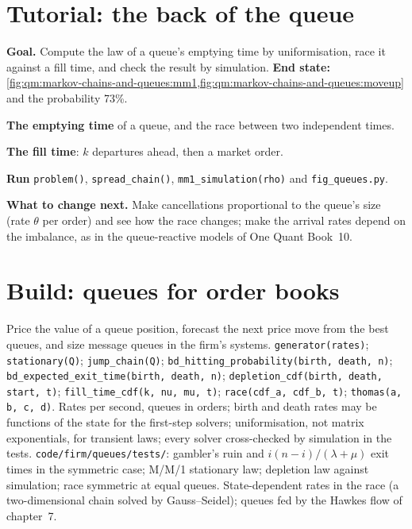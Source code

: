 \section{Tutorial: the back of the queue}\label{tut:qm:markov-chains-and-queues:queue}

\begin{tutorial}
\textbf{Goal.} Compute the law of a queue's emptying time by uniformisation, race it against a fill time, and
check the result by simulation. \textbf{End state:}
\cref{fig:qm:markov-chains-and-queues:mm1,fig:qm:markov-chains-and-queues:moveup} and the probability 73\%.
\begin{tutsteps}
\item \textbf{The emptying time} of a queue, and the race between two independent times.
\label{lst:qm:markov-chains-and-queues:depletion}
\item \textbf{The fill time}: $k$ departures ahead, then a market order.
\label{lst:qm:markov-chains-and-queues:fill}
\item \textbf{Run} \texttt{problem()}, \texttt{spread\_chain()}, \texttt{mm1\_simulation(rho)} and
\texttt{fig\_queues.py}.
\end{tutsteps}
\textbf{What to change next.} Make cancellations proportional to the queue's size (rate $\theta$ per order) and see
how the race changes; make the arrival rates depend on the imbalance, as in the queue-reactive models of One
Quant Book~10.
\end{tutorial}

\section{Build: queues for order books}\label{bld:qm:markov-chains-and-queues:queues}

\begin{build}
 Price the value of a queue position, forecast the next price move from the best queues, and
size message queues in the firm's systems.
 \texttt{generator(rates)}; \texttt{stationary(Q)}; \texttt{jump\_chain(Q)};
\texttt{bd\_hitting\_probability(birth, death, n)}; \texttt{bd\_expected\_exit\_time(birth, death, n)};
\texttt{depletion\_cdf(birth, death, start, t)}; \texttt{fill\_time\_cdf(k, nu, mu, t)}; \texttt{race(cdf\_a,
cdf\_b, t)}; \texttt{thomas(a, b, c, d)}.
 Rates per second, queues in orders; birth and death rates may be functions of the state for the
first-step solvers; uniformisation, not matrix exponentials, for transient laws; every solver cross-checked by
simulation in the tests.
 \texttt{code/firm/queues/tests/}: gambler's ruin and $i(n - i)/(\lambda + \mu)$ exit times in the
symmetric case; M/M/1 stationary law; depletion law against simulation; race symmetric at equal queues.
 State-dependent rates in the race (a two-dimensional chain solved by Gauss--Seidel); queues fed
by the Hawkes flow of chapter~7.
\end{build}


